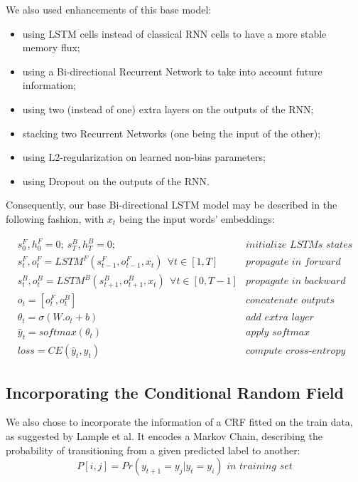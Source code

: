 \documentclass{article} %
\begin{document}
We also used enhancements of this base model:

\begin{itemize}
\itemsep1pt\parskip0pt
\item
  using LSTM cells instead of classical RNN cells to have a more stable
  memory flux;
\item
  using a Bi-directional Recurrent Network to take into account future
  information;
\item
  using two (instead of one) extra layers on the outputs of the RNN;
\item
  stacking two Recurrent Networks (one being the input of the other);
\item
  using L2-regularization on learned non-bias parameters;
\item
  using Dropout on the outputs of the RNN.
\end{itemize}

Consequently, our base Bi-directional LSTM model may be described in the
following fashion, with $x_t$ being the input words' embeddings:

\begin{align*}
&s^F_0, h^F_0 = 0;\ s^B_T, h^B_T = 0; &\textit{initialize LSTMs states}
\\
&s^F_t, o^F_t = LSTM^F(s^F_{t-1}, o^F_{t-1}, x_t) \ \ \forall t \in [1, T] &\textit{propagate in forward LSTM}
\\
&s^B_t, o^B_t = LSTM^B(s^B_{t+1}, o^B_{t+1}, x_t) \ \ \forall t \in [0, T-1] &\textit{propagate in backward LSTM}
\\
& o_t = [o^F_t, o^B_t] & \textit{concatenate outputs}
\\
& \theta_t = \sigma(W.o_t + b) & \textit{add extra layer}
\\
& \hat{y}_t =softmax(\theta_t) & \textit{apply softmax}
\\
& loss = CE(\hat{y}_t, y_t) & \textit{compute cross-entropy}
\end{align*}


\subsection{Incorporating the Conditional Random Field}

We also chose to incorporate the information of a CRF fitted on the
train data, as suggested by Lample et al\cite{lample2016neural}. It encodes a Markov Chain, describing the probability of transitioning from a given predicted label to another: \[
P[i, j] = Pr(y_{t+1} = y_j | y_{t} =y_i) \textit{ in training set}
\]
\end{document}
